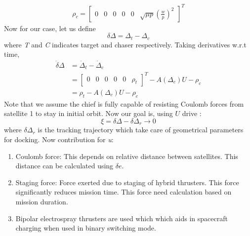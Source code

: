 \documentclass[]{article}
\theoremstyle{remark}
\theoremstyle{definition}
\begin{document}
	\begin{align}
		\rho_c = \begin{bmatrix} 0 & 0 & 0 &0& 0 & \sqrt{\mu p}\left(\frac{w}{p}\right)^2 \end{bmatrix}^T
	\end{align}
	\newline
	Now for our case, let us define 
	\begin{equation}
		\delta \Delta = \Delta_t-\Delta_c
	\end{equation}
	where \textit{T} and \textit{C} indicates target and chaser respectively. Taking derivatives w.r.t time,
	\begin{align}
		\dot \delta \Delta &= \dot \Delta_t - \dot \Delta_c \\
		&= \begin{bmatrix} 0&0&0&0&0&\rho_t
		\end{bmatrix}^T - A(\Delta_c)U-\rho_c\\
		& = \rho_t -  A(\Delta_c)U-\rho_c
	\end{align}
	Note that we assume the chief is fully capable of resisting Coulomb forces from satellite 1 to stay in initial orbit. \newline
	Now our goal is, using $U$ drive :
	\[
	\xi = \delta \Delta-\delta \Delta_r \to 0
	\]
	where $\delta \Delta_r$ is the tracking trajectory which take care of geometrical parameters for docking. \newline 
	Now contribution for \textit{u}:
	\begin{enumerate}
		\item Coulomb force: This depends on relative distance between satellites. This distance can be calculated using $\delta e$. 
		\item Staging force: Force exerted due to staging of hybrid thrusters. This force significantly reduces mission time. This force need calculation based on mission duration.
		\item Bipolar electrospray thrusters are used which which aids in spacecraft charging when used in binary switching mode.
	\end{enumerate}
\end{document}
